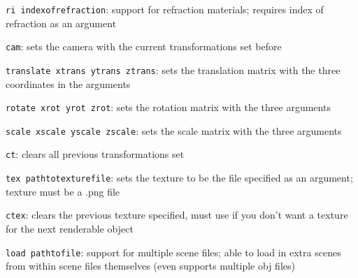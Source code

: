 \documentclass{article}
\begin{document}
\verb+ri indexofrefraction+:
support for refraction materials; requires index of refraction as an argument

\verb+cam+:
sets the camera with the current transformations set before

\verb+translate xtrans ytrans ztrans+:
sets the translation matrix with the three coordinates in the arguments

\verb+rotate xrot yrot zrot+:
sets the rotation matrix with the three arguments

\verb+scale xscale yscale zscale+:
sets the scale matrix with the three arguments

\verb+ct+:
clears all previous transformations set

\verb+tex pathtotexturefile+:
sets the texture to be the file specified as an argument; texture must be a .png file

\verb+ctex+:
clears the previous texture specified, must use if you don’t want a texture for the next renderable object

\verb+load pathtofile+:
support for multiple scene files; able to load in extra scenes from within scene files themselves (even supports multiple obj files)
\end{document}
